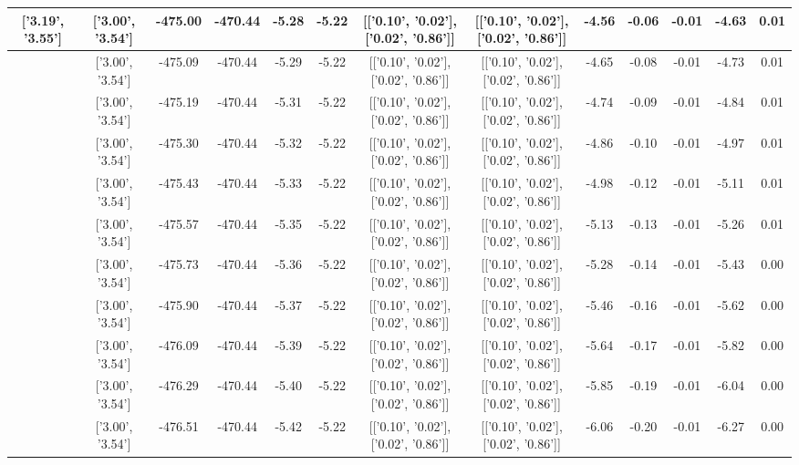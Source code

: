 \begin{table}[htbp]
\begin{adjustbox}{angle=90}
\begin{tabular}{|c|c|c|c|c|c|c|c|c|c|c|c|c|}
 ['3.19', '3.55'] & ['3.00', '3.54'] & -475.00 & -470.44 & -5.28 & -5.22 & [['0.10', '0.02'], ['0.02', '0.86']] & [['0.10', '0.02'], ['0.02', '0.86']] & -4.56 & -0.06 & -0.01 & -4.63 & 0.01\\ \hline
 ['3.23', '3.56'] & ['3.00', '3.54'] & -475.09 & -470.44 & -5.29 & -5.22 & [['0.10', '0.02'], ['0.02', '0.86']] & [['0.10', '0.02'], ['0.02', '0.86']] & -4.65 & -0.08 & -0.01 & -4.73 & 0.01\\ \hline
 ['3.26', '3.56'] & ['3.00', '3.54'] & -475.19 & -470.44 & -5.31 & -5.22 & [['0.10', '0.02'], ['0.02', '0.86']] & [['0.10', '0.02'], ['0.02', '0.86']] & -4.74 & -0.09 & -0.01 & -4.84 & 0.01\\ \hline
 ['3.30', '3.56'] & ['3.00', '3.54'] & -475.30 & -470.44 & -5.32 & -5.22 & [['0.10', '0.02'], ['0.02', '0.86']] & [['0.10', '0.02'], ['0.02', '0.86']] & -4.86 & -0.10 & -0.01 & -4.97 & 0.01\\ \hline
 ['3.34', '3.56'] & ['3.00', '3.54'] & -475.43 & -470.44 & -5.33 & -5.22 & [['0.10', '0.02'], ['0.02', '0.86']] & [['0.10', '0.02'], ['0.02', '0.86']] & -4.98 & -0.12 & -0.01 & -5.11 & 0.01\\ \hline
 ['3.38', '3.57'] & ['3.00', '3.54'] & -475.57 & -470.44 & -5.35 & -5.22 & [['0.10', '0.02'], ['0.02', '0.86']] & [['0.10', '0.02'], ['0.02', '0.86']] & -5.13 & -0.13 & -0.01 & -5.26 & 0.01\\ \hline
 ['3.42', '3.57'] & ['3.00', '3.54'] & -475.73 & -470.44 & -5.36 & -5.22 & [['0.10', '0.02'], ['0.02', '0.86']] & [['0.10', '0.02'], ['0.02', '0.86']] & -5.28 & -0.14 & -0.01 & -5.43 & 0.00\\ \hline
 ['3.45', '3.57'] & ['3.00', '3.54'] & -475.90 & -470.44 & -5.37 & -5.22 & [['0.10', '0.02'], ['0.02', '0.86']] & [['0.10', '0.02'], ['0.02', '0.86']] & -5.46 & -0.16 & -0.01 & -5.62 & 0.00\\ \hline
 ['3.49', '3.57'] & ['3.00', '3.54'] & -476.09 & -470.44 & -5.39 & -5.22 & [['0.10', '0.02'], ['0.02', '0.86']] & [['0.10', '0.02'], ['0.02', '0.86']] & -5.64 & -0.17 & -0.01 & -5.82 & 0.00\\ \hline
 ['3.53', '3.58'] & ['3.00', '3.54'] & -476.29 & -470.44 & -5.40 & -5.22 & [['0.10', '0.02'], ['0.02', '0.86']] & [['0.10', '0.02'], ['0.02', '0.86']] & -5.85 & -0.19 & -0.01 & -6.04 & 0.00\\ \hline
 ['3.57', '3.58'] & ['3.00', '3.54'] & -476.51 & -470.44 & -5.42 & -5.22 & [['0.10', '0.02'], ['0.02', '0.86']] & [['0.10', '0.02'], ['0.02', '0.86']] & -6.06 & -0.20 & -0.01 & -6.27 & 0.00\\ \hline

\end{tabular}
\end{adjustbox}
\end{table}
